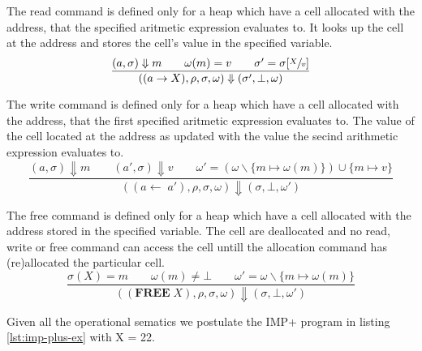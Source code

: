 The read command is defined only for a heap which have a cell allocated with the address, that the specified aritmetic expression evaluates to. It looks up the cell at the address and stores the cell's value in the specified variable.
\begin{equation}
\frac
{(a,\sigma) \Downarrow m \qquad \omega(m)=v \qquad \sigma'=\sigma[\sfrac{X}{v}]}
{((a \rightarrow X), \rho, \sigma, \omega) \Downarrow (\sigma', \bot, \omega)}
\end{equation}

The write command is defined only for a heap which have a cell allocated with the address, that the first specified aritmetic expression evaluates to. The value of the cell located at the address as updated with the value the secind arithmetic expression evaluates to.
\begin{equation}
\frac
{(a,\sigma)\Downarrow m \qquad (a',\sigma)\Downarrow v \qquad \omega'=(\omega\backslash\{m\mapsto\omega(m)\})\cup\{m\mapsto v\}}
{((a\leftarrow\;a'), \rho, \sigma, \omega) \Downarrow (\sigma, \bot, \omega')}
\end{equation}

The free command is defined only for a heap which have a cell allocated with the address stored in the specified variable. The cell are deallocated and no read, write or free command can access the cell untill the allocation command has (re)allocated the particular cell.
\begin{equation}
\frac
{\sigma(X)=m \qquad \omega(m)\neq\bot \qquad \omega'=\omega\backslash\{m\mapsto\omega(m)\}}
{((\textbf{FREE}\;X), \rho, \sigma, \omega) \Downarrow (\sigma, \bot, \omega')}
\end{equation}

\begin{prop}
Given all the operational sematics we postulate the IMP+ program in listing \ref{lst:imp-plus-ex} with X = 22.
\end{prop}